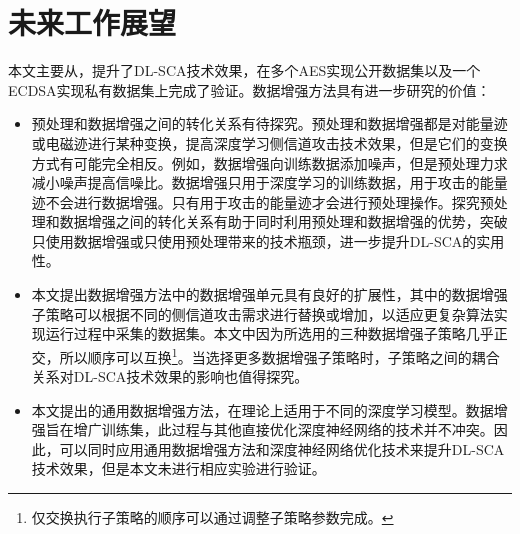 {	\section{未来工作展望}
	本文主要从\jiaodu，提升了DL-SCA技术效果，在多个AES实现公开数据集以及一个ECDSA实现私有数据集上完成了验证。数据增强方法具有进一步研究的价值：
	\begin{itemize}
		\item 预处理和数据增强之间的转化关系有待探究。预处理和数据增强都是对能量迹或电磁迹进行某种变换，提高深度学习侧信道攻击技术效果，但是它们的变换方式有可能完全相反。例如，数据增强向训练数据添加噪声，但是预处理力求减小噪声提高信噪比。数据增强只用于深度学习的训练数据，用于攻击的能量迹不会进行数据增强。只有用于攻击的能量迹才会进行预处理操作。探究预处理和数据增强之间的转化关系有助于同时利用预处理和数据增强的优势，突破只使用数据增强或只使用预处理带来的技术瓶颈，进一步提升DL-SCA的实用性。
		\item 本文提出数据增强方法中的数据增强单元具有良好的扩展性，其中的数据增强子策略可以根据不同的侧信道攻击需求进行替换或增加，以适应更复杂算法实现运行过程中采集的数据集。本文中因为所选用的三种数据增强子策略几乎正交，所以顺序可以互换\footnote{仅交换执行子策略的顺序可以通过调整子策略参数完成。}。当选择更多数据增强子策略时，子策略之间的耦合关系对DL-SCA技术效果的影响也值得探究。
		\item 本文提出的通用数据增强方法，在理论上适用于不同的深度学习模型。数据增强旨在增广训练集，此过程与其他直接优化深度神经网络的技术并不冲突。因此，可以同时应用通用数据增强方法和深度神经网络优化技术来提升DL-SCA技术效果，但是本文未进行相应实验进行验证。
	\end{itemize}
}